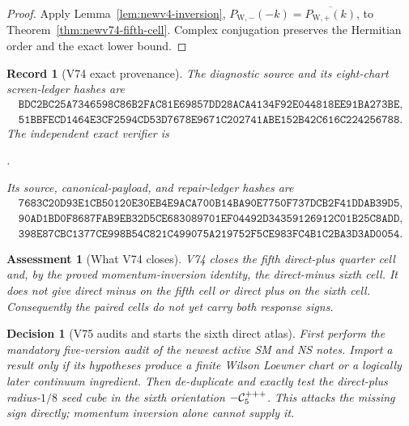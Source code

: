 \documentclass[11pt,oneside]{article}
\newtheorem{assessment}[theorem]{Assessment}
\newtheorem{record}[theorem]{Record}
\newtheorem{decision}[theorem]{Decision}
\theoremstyle{definition}
\theoremstyle{remark}
\begin{document}
\begin{proof}
Apply Lemma~\ref{lem:newv4-inversion},
\(P_{\mathrm W,-}(-k)=\overline{P_{\mathrm W,+}(k)}\), to
Theorem~\ref{thm:newv74-fifth-cell}.  Complex conjugation preserves
the Hermitian order and the exact lower bound.
\end{proof}

\begin{record}[V74 exact provenance]
\label{rec:newv74-provenance}
The diagnostic source and its eight-chart screen-ledger hashes are
\[
\begin{gathered}
\texttt{BDC2BC25A7346598C86B2FAC81E69857DD28ACA4134F92E044818EE91BA273BE},\\
\texttt{51BBFECD1464E3CF2594CD53D7678E9671C202741ABE152B42C616C224256788}.
\end{gathered}                                         \tag{74.11}
\]
The independent exact verifier is
\begin{center}
\footnotesize
{}.
\end{center}
Its source, canonical-payload, and repair-ledger hashes are
\[
\begin{gathered}
\texttt{7683C20D93E1CB50120E30EB4E9ACA700B14BA90E7750F737DCB2F41DDAB39D5},\\
\texttt{90AD1BD0F8687FAB9EB32D5CE683089701EF04492D34359126912C01B25C8ADD},\\
\texttt{398E87CBC1377CE998B54C821C499075A219752F5CE983FC4B1C2BA3D3AD0054}.
\end{gathered}                                         \tag{74.12}
\]
\end{record}

\begin{assessment}[What V74 closes]
\label{ass:newv74}
V74 closes the fifth direct-plus quarter cell and, by the proved
momentum-inversion identity, the direct-minus sixth cell.  It does
not give direct minus on the fifth cell or direct plus on the sixth
cell.  Consequently the paired cells do not yet carry both response
signs.
\end{assessment}

\begin{decision}[V75 audits and starts the sixth direct atlas]
\label{dec:newv74-next}
First perform the mandatory five-version audit of the newest active
SM and NS notes.  Import a result only if its hypotheses produce a
finite Wilson Loewner chart or a logically later continuum
ingredient.  Then de-duplicate and exactly test the direct-plus
radius-\(1/8\) seed cube in the sixth orientation
\(-{\cal C}^{+++}_5\).  This attacks the missing sign directly;
momentum inversion alone cannot supply it.
\end{decision}
\end{document}

